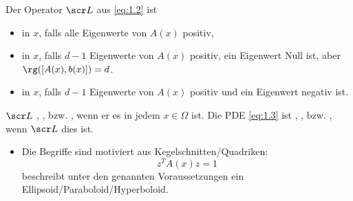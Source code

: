 \begin{df}[Klassifikation] \label{1.15}
	Der Operator $\scr L$ aus \eqref{eq:1.2} ist
	\begin{itemize}
		\item
			 in $x$, falls alle Eigenwerte von $A(x)$ positiv,
		\item
			 in $x$, falls $d-1$ Eigenwerte von $A(x)$ positiv, ein Eigenwert Null ist, aber $\rg([A(x),b(x)]) = d$.
		\item
			 in $x$, falls $d-1$ Eigenwerte von $A(x)$ positiv und ein Eigenwert negativ ist.
	\end{itemize}
	$\scr L$ , , bzw. , wenn er es in jedem $x \in \Omega$ ist.
	Die PDE \eqref{eq:1.3} ist , , bzw. , wenn $\scr L$ dies ist.
	\begin{note}
		\begin{itemize}
			\item
				Die Begriffe sind motiviert aus Kegelschnitten/Quadriken:
				\[
					z^T A(x) z = 1
				\]
				beschreibt unter den genannten Voraussetzungen ein Ellipsoid/Paraboloid/Hyperboloid.
		\end{itemize}
	\end{note}
\end{df}


